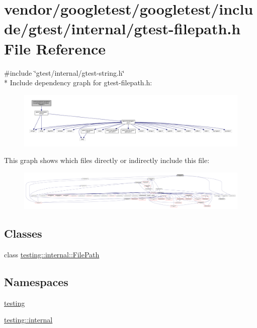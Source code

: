 \hypertarget{gtest-filepath_8h}{}\section{vendor/googletest/googletest/include/gtest/internal/gtest-\/filepath.h File Reference}
\label{gtest-filepath_8h}
{\ttfamily \#include \char`\"{}gtest/internal/gtest-\/string.\+h\char`\"{}}\\*
Include dependency graph for gtest-\/filepath.h\+:
\nopagebreak
\begin{figure}[H]
\begin{center}
\leavevmode
\includegraphics[width=350pt]{gtest-filepath_8h__incl}
\end{center}
\end{figure}
This graph shows which files directly or indirectly include this file\+:
\nopagebreak
\begin{figure}[H]
\begin{center}
\leavevmode
\includegraphics[width=350pt]{gtest-filepath_8h__dep__incl}
\end{center}
\end{figure}
\subsection*{Classes}
\begin{DoxyCompactItemize}
\item 
class \hyperlink{classtesting_1_1internal_1_1FilePath}{testing\+::internal\+::\+File\+Path}
\end{DoxyCompactItemize}
\subsection*{Namespaces}
\begin{DoxyCompactItemize}
\item 
 \hyperlink{namespacetesting}{testing}
\item 
 \hyperlink{namespacetesting_1_1internal}{testing\+::internal}
\end{DoxyCompactItemize}

